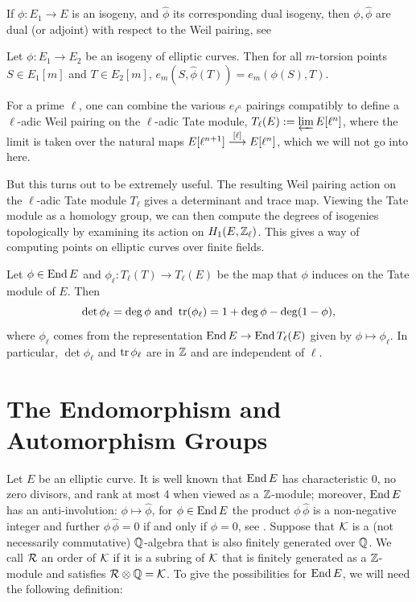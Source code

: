 If $\phi: E_1 \to E$ is an isogeny, and $\hat{\phi}$ its corresponding dual isogeny, then $\phi, \hat{\phi}$ are dual (or adjoint) with respect to the Weil pairing, see \cite[III.8.2]{silvermanarithmetic}


\begin{prop}
Let $\phi: E_1 \to E_2$ be an isogeny of elliptic curves. Then for all $m$-torsion points $S \in E_1[m]$ and $T \in E_2[m]$, $e_m(S, \hat{\phi}(T))= e_m(\phi(S),T)$.
\end{prop}


For a prime $\ell$, one can combine the various $e_{\ell^n}$ pairings compatibly to define a $\ell$-adic Weil pairing on the $\ell$-adic Tate module, $T_\ell(E):= \varprojlim E[\ell^n]$, where the limit is taken over the natural maps $E[\ell^{n+1}] \stackrel{[\ell]}{\longrightarrow} E[\ell^n]$, which we will not go into here. 


But this turns out to be extremely useful. The resulting Weil pairing action on the $\ell$-adic Tate module $T_\ell$ gives a determinant and trace map. Viewing the Tate module as a homology group, we can then compute the degrees of isogenies topologically by examining its action on $H_1(E, \mathbb{Z}_\ell)$. This gives a way of computing points on elliptic curves over finite fields. 


\begin{prop}
Let $\phi \in \operatorname{End} E$ and $\phi_\ell: T_\ell(T) \to T_\ell(E)$ be the map that $\phi$ induces on the Tate module of $E$. Then 
	\[
	\det \phi_\ell= \deg \phi \text{ and } \operatorname{tr}(\phi_\ell)= 1 + \deg \phi - \deg(1 - \phi),
	\]
where $\phi_\ell$ comes from the representation $\operatorname{End} E \to \operatorname{End} T_\ell(E)$ given by $\phi \mapsto \phi_\ell$. In particular, $\det \phi_\ell$ and $\operatorname{tr} \phi_\ell$ are in $\mathbb{Z}$ and are independent of $\ell$. 
\end{prop}





\section{The Endomorphism and Automorphism Groups\label{sec:endaut}}

Let $E$ be an elliptic curve. It is well known that $\operatorname{End} E$ has characteristic 0, no zero divisors, and rank at most 4 when viewed as a $\mathbb{Z}$-module; moreover, $\operatorname{End} E$ has an anti-involution: $\phi \mapsto \hat{\phi}$, for $\phi \in \operatorname{End} E$ the product $\phi \,\hat{\phi}$ is a non-negative integer and further $\phi \,\hat{\phi}= 0$ if and only if $\phi= 0$, see \cite[\S III]{silvermanarithmetic}. Suppose that $\mathcal{K}$ is a (not necessarily commutative) $\mathbb{Q}$-algebra that is also finitely generated over $\mathbb{Q}$. We call $\mathcal{R}$ an order of $\mathcal{K}$ if it is a subring of $\mathcal{K}$ that is finitely generated as a $\mathbb{Z}$-module and satisfies $\mathcal{R} \otimes \mathbb{Q}= \mathcal{K}$. To give the possibilities for $\operatorname{End} E$, we will need the following definition: 


